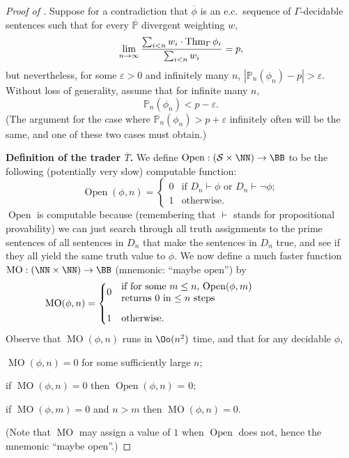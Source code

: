 \documentclass[authordate,onecolumn,noenvironments]{miri-tech-article}
\numberwithin{equation}{subsection}
\newcommand{\seq}[1]{{\overline{#1}}}
\newcommand{\mm}{m}
\newcommand{\nn}{n}
\newcommand{\fuz}{w}
\newcommand{\phis}{\seq{\phi}}
\newcommand{\ec}[1][\ ]{e.c.#1}
\newcommand{\pgenable}{\ensuremath{\MP}\text{-generable}\xspace}
\newcommand{\tinysection}[1]{\medskip\noindent\textbf{#1.}}
\newcommand{\trade}{T}%
\newcommand{\Trader}{\seq{\trade}} %
\newcommand{\BelState}{\mathbb{P}}
\newcommand{\pt}{\BelState}
\newcommand{\MP}{\seq{\pt}}
\newcommand{\dt}{D}
\newcommand{\Theory}{\Gamma}
\newcommand{\Sentences}{\mathcal{S}}
\newcommand{\thmind}[1][\Theory]{\operatorname{Thm}_{#1}\-} %
\begin{document}
\begin{proof}[Proof of ]
  Suppose for a contradiction that $\phis$ is an \ec sequence of $\Theory$-decidable sentences such that for every \pgenable divergent weighting $\fuz$,
  \[
    \lim_{\nn \to\infty} \frac{\sum_{i < \nn} \fuz_{i} \cdot \thmind{\phi_i}}{\sum_{i < n} \fuz_{i}} = p,
  \]
  but nevertheless, for some $\varepsilon > 0$ and  infinitely many $\nn$, $|\pt_\nn(\phi_\nn) - p| > \varepsilon$.  Without loss of generality, assume that for infinite many $\nn$, %
  \[\pt_\nn(\phi_\nn) < p -\varepsilon.\]
  (The argument for the case where 
  $\pt_\nn(\phi_\nn) > p +\varepsilon$ infinitely often will be the same, and one of these two cases must obtain.)

  \tinysection{Definition of the trader $\Trader$}
  \newcommand{\open}{\operatorname{Open}}
  \newcommand{\mopen}{\operatorname{MO}}
  We define $\open:(\Sentences\times\NN)\to \BB$ to be the following (potentially very slow) computable function:
  \[
    \open(\phi,n)=\begin{cases}
      0 &\mbox{if $D_\nn\vdash \phi$ or $D_\nn\vdash \lnot\phi$};\\
      1 &\mbox{otherwise.}
    \end{cases}
  \]
  $\open$ is computable because (remembering that $\vdash$ stands for propositional provability) we can just search through all truth assignments to the prime sentences of all sentences in $\dt_\nn$ that make the sentences in $\dt_\nn$ true, and see if they all yield the same truth value to $\phi$.  We now define a much faster function  $\mopen:(\NN\times\NN)\to \BB$ (mnemonic: ``maybe open'') by
  \[
    \mopen(\phi,n)=\begin{cases}
      0 &\parbox{20em}{if for some $m\le\nn$, $\open(\phi,m)$\\ returns $0$ in $\leq \nn$ steps}\vspace{2ex}\\
      1 &\text{otherwise.}
    \end{cases}
  \]
  Observe that $\mopen(\phi,n)$ runs in $\Oo(\nn^2)$ time, and that for any decidable $\phi$,
  \begin{itemize*}
    \item  $\mopen(\phi,\nn)= 0$ for some sufficiently large $\nn$;
    \item  if $\mopen(\phi,\nn)= 0$ then $\open(\phi,\nn)$ = 0;
    \item  if $\mopen(\phi,\mm)= 0$ and $\nn>\mm$ then $\mopen(\phi,\nn)=0$.
  \end{itemize*}
  (Note that $\mopen$ may assign a value of $1$ when $\open$ does not, hence the mnemonic ``maybe open''.)  


\end{proof}
\end{document}
